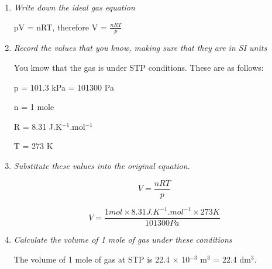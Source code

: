 \begin{enumerate}

\item{\textit{Write down the ideal gas equation}}
\begin{center}
pV = nRT, therefore V = $\frac{nRT}{p}$
\end{center}

\item{\textit{Record the values that you know, making sure that they are in SI units}}

You know that the gas is under STP conditions. These are as follows:

p = 101.3 kPa = 101300 Pa

n = 1 mole

R = 8.31 J.K$^{-1}$.mol$^{-1}$

T = 273 K

\item{\textit{Substitute these values into the original equation.}}

\begin{equation*}
V = \frac{nRT}{p}
\end{equation*}

\begin{equation*}
V = \frac{1 mol \times 8.31 J.K^{-1}.mol^{-1} \times 273 K}{101300 Pa}
\end{equation*}

\item{\textit{Calculate the volume of 1 mole of gas under these conditions}

The volume of 1 mole of gas at STP is 22.4 $\times$ 10$^{-3}$ m$^{3}$ = 22.4 dm$^{3}$.}
\end{enumerate}


